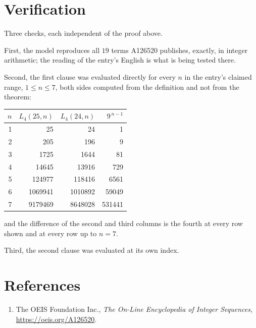 \documentclass[11pt,a4paper]{article}
\theoremstyle{plain}
\theoremstyle{definition}
\begin{document}
\section{Verification}

Three checks, each independent of the proof above.

First, the model reproduces all $19$ terms A126520 publishes, exactly, in integer
arithmetic; the reading of the entry's English is what is being tested there.

Second, the first clause was evaluated directly for every $n$ in the entry's claimed range,
$1\le n\le7$, both sides computed from the definition and not from the theorem:

\begin{center}
\begin{tabular}{rrrr}
$n$ & $L_{4}(25,n)$ & $L_{4}(24,n)$ & $9^{\,n-1}$ \\ \hline
1 & 25 & 24 & 1 \\
2 & 205 & 196 & 9 \\
3 & 1725 & 1644 & 81 \\
4 & 14645 & 13916 & 729 \\
5 & 124977 & 118416 & 6561 \\
6 & 1069941 & 1010892 & 59049 \\
7 & 9179469 & 8648028 & 531441 \\
\end{tabular}
\end{center}

\noindent and the difference of the second and third columns is the fourth at every row shown
and at every row up to $n=7$.

Third, the second clause was evaluated at its own index.

\section*{References}
\begin{enumerate}
\item The OEIS Foundation Inc., \emph{The On-Line Encyclopedia of Integer Sequences},
\url{https://oeis.org/A126520}.
\end{enumerate}
\end{document}
